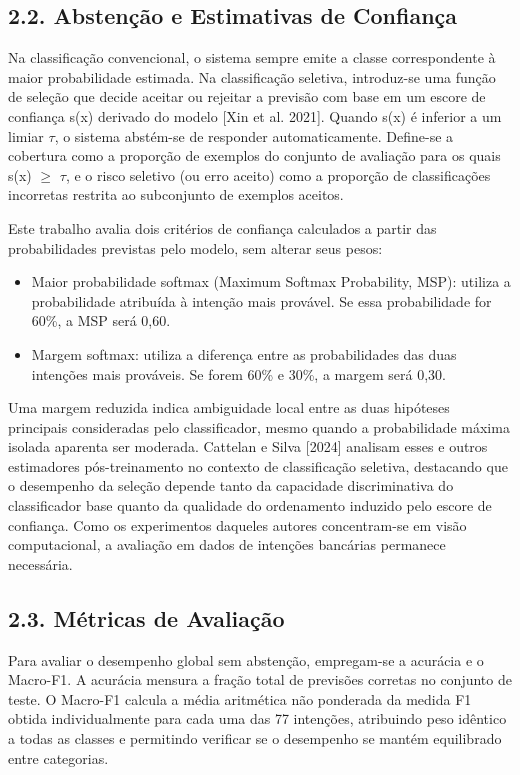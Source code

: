 \documentclass[12pt,a4paper]{article}
\begin{document}
\subsection*{\textbf{2.2. Abstenção e Estimativas de Confiança}}

Na classificação convencional, o sistema sempre emite a classe correspondente à maior probabilidade estimada. Na classificação seletiva, introduz-se uma função de seleção que decide aceitar ou rejeitar a previsão com base em um escore de confiança s(x) derivado do modelo [Xin et al. 2021]. Quando s(x) é inferior a um limiar \ensuremath{\tau}, o sistema abstém-se de responder automaticamente. Define-se a cobertura como a proporção de exemplos do conjunto de avaliação para os quais s(x) \ensuremath{\geq} \ensuremath{\tau}, e o risco seletivo (ou erro aceito) como a proporção de classificações incorretas restrita ao subconjunto de exemplos aceitos.

Este trabalho avalia dois critérios de confiança calculados a partir das probabilidades previstas pelo modelo, sem alterar seus pesos:

\begin{itemize}
\item Maior probabilidade softmax (Maximum Softmax Probability, MSP): utiliza a probabilidade atribuída à intenção mais provável. Se essa probabilidade for 60\%, a MSP será 0,60.
\item Margem softmax: utiliza a diferença entre as probabilidades das duas intenções mais prováveis. Se forem 60\% e 30\%, a margem será 0,30.
\end{itemize}


Uma margem reduzida indica ambiguidade local entre as duas hipóteses principais consideradas pelo classificador, mesmo quando a probabilidade máxima isolada aparenta ser moderada. Cattelan e Silva [2024] analisam esses e outros estimadores pós-treinamento no contexto de classificação seletiva, destacando que o desempenho da seleção depende tanto da capacidade discriminativa do classificador base quanto da qualidade do ordenamento induzido pelo escore de confiança. Como os experimentos daqueles autores concentram-se em visão computacional, a avaliação em dados de intenções bancárias permanece necessária.

\subsection*{\textbf{2.3. Métricas de Avaliação}}

Para avaliar o desempenho global sem abstenção, empregam-se a acurácia e o Macro-F1. A acurácia mensura a fração total de previsões corretas no conjunto de teste. O Macro-F1 calcula a média aritmética não ponderada da medida F1 obtida individualmente para cada uma das 77 intenções, atribuindo peso idêntico a todas as classes e permitindo verificar se o desempenho se mantém equilibrado entre categorias.
\end{document}
